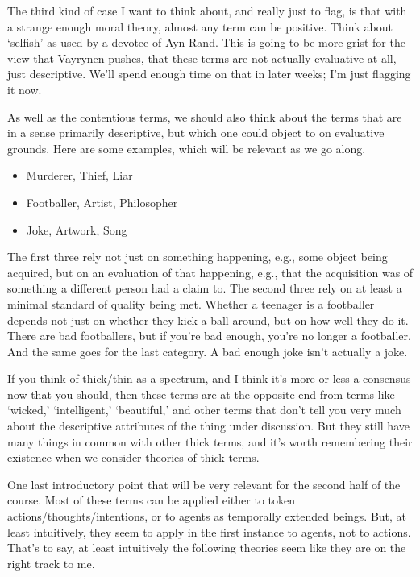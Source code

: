 \documentclass[
]{article}
\providecommand{\tightlist}{%
  \setlength{\itemsep}{0pt}\setlength{\parskip}{0pt}}
\begin{document}
The third kind of case I want to think about, and really just to flag,
is that with a strange enough moral theory, almost any term can be
positive. Think about `selfish' as used by a devotee of Ayn Rand. This
is going to be more grist for the view that Vayrynen pushes, that these
terms are not actually evaluative at all, just descriptive. We'll spend
enough time on that in later weeks; I'm just flagging it now.

As well as the contentious terms, we should also think about the terms
that are in a sense primarily descriptive, but which one could object to
on evaluative grounds. Here are some examples, which will be relevant as
we go along.

\begin{itemize}
\tightlist
\item
  Murderer, Thief, Liar
\item
  Footballer, Artist, Philosopher
\item
  Joke, Artwork, Song
\end{itemize}

The first three rely not just on something happening, e.g., some object
being acquired, but on an evaluation of that happening, e.g., that the
acquisition was of something a different person had a claim to. The
second three rely on at least a minimal standard of quality being met.
Whether a teenager is a footballer depends not just on whether they kick
a ball around, but on how well they do it. There are bad footballers,
but if you're bad enough, you're no longer a footballer. And the same
goes for the last category. A bad enough joke isn't actually a joke.

If you think of thick/thin as a spectrum, and I think it's more or less
a consensus now that you should, then these terms are at the opposite
end from terms like `wicked,' `intelligent,' `beautiful,' and other
terms that don't tell you very much about the descriptive attributes of
the thing under discussion. But they still have many things in common
with other thick terms, and it's worth remembering their existence when
we consider theories of thick terms.

One last introductory point that will be very relevant for the second
half of the course. Most of these terms can be applied either to token
actions/thoughts/intentions, or to agents as temporally extended beings.
But, at least intuitively, they seem to apply in the first instance to
agents, not to actions. That's to say, at least intuitively the
following theories seem like they are on the right track to me.
\end{document}
